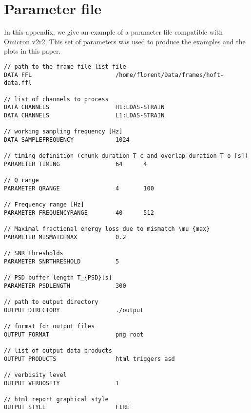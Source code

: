 \appendix
\section{Parameter file}\label{appx:parameters}
In this appendix, we give an example of a parameter file compatible with Omicron v2r2. This set of parameters was used to produce the examples and the plots in this paper.

\begin{verbatim}
// path to the frame file list file
DATA FFL                        /home/florent/Data/frames/hoft-data.ffl

// list of channels to process
DATA CHANNELS                   H1:LDAS-STRAIN
DATA CHANNELS                   L1:LDAS-STRAIN

// working sampling frequency [Hz]
DATA SAMPLEFREQUENCY            1024

// timing definition (chunk duration T_c and overlap duration T_o [s])
PARAMETER TIMING                64      4

// Q range
PARAMETER QRANGE                4       100

// Frequency range [Hz]
PARAMETER FREQUENCYRANGE        40      512

// Maximal fractional energy loss due to mismatch \mu_{max}
PARAMETER MISMATCHMAX           0.2

// SNR thresholds
PARAMETER SNRTHRESHOLD          5

// PSD buffer length T_{PSD}[s]
PARAMETER PSDLENGTH             300

// path to output directory
OUTPUT DIRECTORY                ./output

// format for output files
OUTPUT FORMAT                   png root

// list of output data products
OUTPUT PRODUCTS                 html triggers asd

// verbisity level
OUTPUT VERBOSITY                1

// html report graphical style
OUTPUT STYLE                    FIRE
\end{verbatim}

